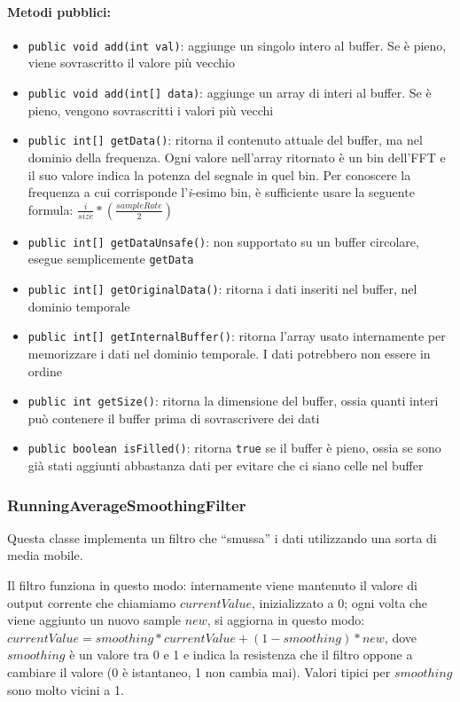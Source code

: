 \paragraph{Metodi pubblici:} \begin{itemize}
	\item \texttt{public void add(int val)}: aggiunge un singolo intero al buffer. Se è pieno, viene sovrascritto il valore più vecchio
	\item \texttt{public void add(int[] data)}: aggiunge un array di interi al buffer. Se è pieno, vengono sovrascritti i valori più vecchi
	\item \texttt{public int[] getData()}: ritorna il contenuto attuale del buffer, ma nel dominio della frequenza. Ogni valore nell'array ritornato è un bin dell'FFT e il suo valore indica la potenza del segnale in quel bin. Per conoscere la frequenza a cui corrisponde l'\textit{i}-esimo bin, è sufficiente usare la seguente formula: ${\frac{i}{size}*(\frac{sampleRate}{2})}$
	\item \texttt{public int[] getDataUnsafe()}: non supportato su un buffer circolare, esegue semplicemente \texttt{getData}
	\item \texttt{public int[] getOriginalData()}: ritorna i dati inseriti nel buffer, nel dominio temporale
	\item \texttt{public int[] getInternalBuffer()}: ritorna l'array usato internamente per memorizzare i dati nel dominio temporale. I dati potrebbero non essere in ordine
	\item \texttt{public int getSize()}: ritorna la dimensione del buffer, ossia quanti interi può contenere il buffer prima di sovrascrivere dei dati
	\item \texttt{public boolean isFilled()}: ritorna \texttt{true} se il buffer è pieno, ossia se sono già stati aggiunti abbastanza dati per evitare che ci siano celle nel buffer
\end{itemize}

\subsubsection{RunningAverageSmoothingFilter}
Questa classe implementa un filtro che ``smussa'' i dati utilizzando una sorta di media mobile.

Il filtro funziona in questo modo: internamente viene mantenuto il valore di output corrente che chiamiamo $currentValue$, inizializzato a 0; ogni volta che viene aggiunto un nuovo sample $new$, si aggiorna in questo modo: ${currentValue=smoothing*currentValue+(1-smoothing)*new}$, dove $smoothing$ è un valore tra 0 e 1 e indica la resistenza che il filtro oppone a cambiare il valore (0 è istantaneo, 1 non cambia mai). Valori tipici per $smoothing$ sono molto vicini a 1.

